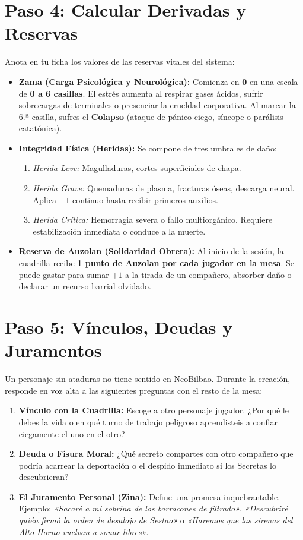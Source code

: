 \section{Paso 4: Calcular Derivadas y Reservas}
Anota en tu ficha los valores de las reservas vitales del sistema:
\begin{itemize}
    \item \textbf{Zama (Carga Psicológica y Neurológica):} Comienza en \textbf{0} en una escala de \textbf{0 a 6 casillas}. El estrés aumenta al respirar gases ácidos, sufrir sobrecargas de terminales o presenciar la crueldad corporativa. Al marcar la 6.ª casilla, sufres el \textbf{Colapso} (ataque de pánico ciego, síncope o parálisis catatónica).
    \item \textbf{Integridad Física (Heridas):} Se compone de tres umbrales de daño:
    \begin{enumerate}
        \item \textit{Herida Leve:} Magulladuras, cortes superficiales de chapa.
        \item \textit{Herida Grave:} Quemaduras de plasma, fracturas óseas, descarga neural. Aplica $-1$ continuo hasta recibir primeros auxilios.
        \item \textit{Herida Crítica:} Hemorragia severa o fallo multiorgánico. Requiere estabilización inmediata o conduce a la muerte.
    \end{enumerate}
    \item \textbf{Reserva de Auzolan (Solidaridad Obrera):} Al inicio de la sesión, la cuadrilla recibe \textbf{1 punto de Auzolan por cada jugador en la mesa}. Se puede gastar para sumar $+1$ a la tirada de un compañero, absorber daño o declarar un recurso barrial olvidado.
\end{itemize}

\section{Paso 5: Vínculos, Deudas y Juramentos}
Un personaje sin ataduras no tiene sentido en NeoBilbao. Durante la creación, responde en voz alta a las siguientes preguntas con el resto de la mesa:
\begin{enumerate}
    \item \textbf{Vínculo con la Cuadrilla:} Escoge a otro personaje jugador. ¿Por qué le debes la vida o en qué turno de trabajo peligroso aprendisteis a confiar ciegamente el uno en el otro?
    \item \textbf{Deuda o Fisura Moral:} ¿Qué secreto compartes con otro compañero que podría acarrear la deportación o el despido inmediato si los Secretas lo descubrieran?
    \item \textbf{El Juramento Personal (Zina):} Define una promesa inquebrantable. Ejemplo: \textit{«Sacaré a mi sobrina de los barracones de filtrado»}, \textit{«Descubriré quién firmó la orden de desalojo de Sestao»} o \textit{«Haremos que las sirenas del Alto Horno vuelvan a sonar libres»}.
\end{enumerate}

